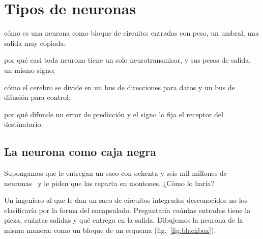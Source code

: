 \chapter{Tipos de neuronas}
\label{sec:neurontypes}
\begin{chaptergoals}
\item cómo es una neurona como bloque de circuito: entradas con peso, un umbral, una salida muy copiada;
\item por qué casi toda neurona tiene un solo neurotransmisor, y sus pesos de salida, un mismo signo;
\item cómo el cerebro se divide en un bus de direcciones para datos y un bus de difusión para control;
\item por qué  difunde un error de predicción y el signo lo fija el receptor del destinatario.
\end{chaptergoals}

\section{La neurona como caja negra}

Supongamos que le entregan un saco con ochenta y seis mil millones de neuronas~\cite{Azevedo2009} y le piden que las reparta en montones. ¿Cómo lo haría?

Un ingeniero al que le dan un saco de circuitos integrados desconocidos no los clasificaría por la forma del encapsulado. Preguntaría cuántas entradas tiene la pieza, cuántas salidas y qué entrega en la salida. Dibujemos la neurona de la misma manera: como un bloque de un esquema (fig.~\ref{fig:blackbox}).

